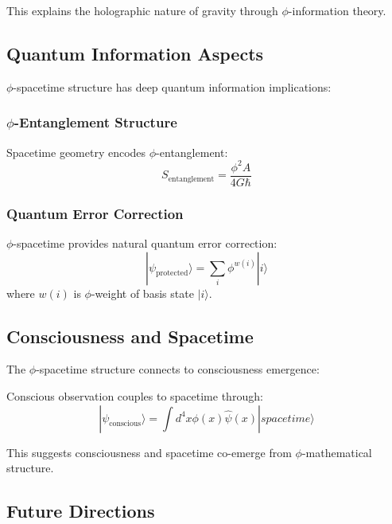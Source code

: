 This explains the holographic nature of gravity through $\phi$-information theory.

\subsection{Quantum Information Aspects}

$\phi$-spacetime structure has deep quantum information implications:

\subsubsection{$\phi$-Entanglement Structure}

Spacetime geometry encodes $\phi$-entanglement:
\begin{equation}
S_{\text{entanglement}} = \frac{\phi^2 A}{4G\hbar}
\end{equation}

\subsubsection{Quantum Error Correction}

$\phi$-spacetime provides natural quantum error correction:
\begin{equation}
|\psi_{\text{protected}}\rangle = \sum_i \phi^{w(i)} |i\rangle
\end{equation}
where $w(i)$ is $\phi$-weight of basis state $|i\rangle$.

\subsection{Consciousness and Spacetime}

The $\phi$-spacetime structure connects to consciousness emergence:

\begin{theorem}
Conscious observation couples to spacetime through:
\begin{equation}
|\psi_{\text{conscious}}\rangle = \int d^4x \phi(x) \hat{\psi}(x) |spacetime\rangle
\label{eq:consciousness_spacetime_coupling}
\end{equation}
\end{theorem}

This suggests consciousness and spacetime co-emerge from $\phi$-mathematical structure.

\subsection{Future Directions}

